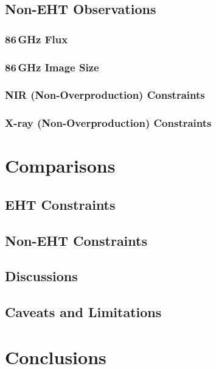 \documentclass[twocolumn,twocolappendix,tighten,dvipsnames,linenumbers]{aastex63}
\begin{document}
\subsection{Non-EHT Observations}
\subsubsection{86\,GHz Flux}
\subsubsection{86\,GHz Image Size}
\subsubsection{NIR (Non-Overproduction) Constraints}
\subsubsection{X-ray (Non-Overproduction) Constraints}

\clearpage

\section{Comparisons}

\subsection{EHT Constraints}

\subsection{Non-EHT Constraints}

\subsection{Discussions}

\subsection{Caveats and Limitations}

\clearpage

\section{Conclusions}
\end{document}
